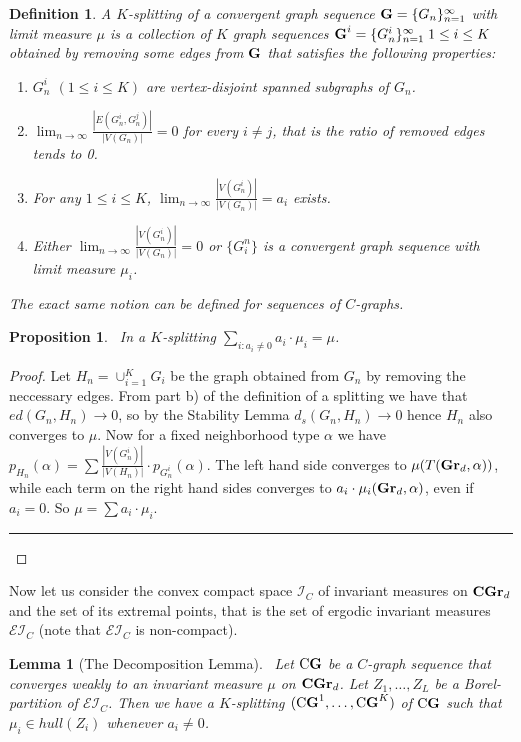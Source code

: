\documentclass{article}
\newtheorem{lemma}{Lemma}[section]
\newtheorem{propo}{Proposition}[section]
\newtheorem{defin}{Definition}[section]
\newcommand{\Grd}[1][d]{\textrm{\textbf{Gr}}_{#1}}
\newcommand{\CGrd}[1][d]{\textrm{\textbf{CGr}}_{#1}}
\newcommand{\G}{\textrm{\textbf{G}}}
\newcommand{\CG}[1][G]{\textrm{C\textbf{#1}}}
\newcommand{\I}{\mathcal{I}}
\newcommand{\EI}{\mathcal{EI}}
\newcommand{\Gseq}[1][G]{\{ #1_n \}_{n=1}^{\infty}}
\newcommand{\qed} {\hspace {0.1in} \rule {1.5mm} {3.5mm}}
\begin{document}
\begin{defin} A \textit{$K$-splitting} of a convergent graph sequence
  $\G = \Gseq$ with limit measure $\mu$ is a collection of $K$ graph
  sequences $\G^i = \Gseq[G^i]\; 1\leq i \leq K$ obtained by removing
  some edges from $\G$ that satisfies the following properties:
\begin{enumerate}
\item $G^i_n$ $(1\leq i\leq K)$ are vertex-disjoint spanned subgraphs of $G_n$.
\item $\lim_{n\to \infty} \frac{|E(G^i_n,G^j_n)|}{|V(G_n)|} = 0$ for
  every $i \neq j$, that is the ratio of removed edges tends to 0. 
\item For any $1\leq i \leq K$,
$\lim_{n\to\infty} \frac {|V(G^i_n)|}{|V(G_n)|} = a_i$ exists.
\item Either $\lim_{n\to\infty} \frac {|V(G^i_n)|}{|V(G_n)|}=0$
or $\{G^n_i\}$ is a convergent graph sequence with limit measure $\mu_i$.
\end{enumerate}
The exact same notion can be defined for sequences of $C$-graphs.
\end{defin}

\begin{propo}~\label{splitting} In a $K$-splitting $\sum_{i: a_i \neq 0} a_i
  \cdot \mu_i = \mu$.
\end{propo}

\begin{proof} Let $H_n = \cup_{i=1}^K G_i$ be the graph obtained from
  $G_n$ by removing the neccessary edges. From part b) of the
  definition of a splitting we have that $ed(G_n,H_n) \to 0$, so by
  the Stability Lemma $d_s(G_n,H_n) \to 0$ hence $H_n$ also converges
  to $\mu$. Now for a fixed neighborhood type $\alpha$ we have
  $p_{H_n}(\alpha) = \sum \frac{|V(G_n^i)|}{|V(H_n)|} \cdot
  p_{G_n^i}(\alpha)$. The left hand side converges to
  $\mu(T(\Grd,\alpha))$, while each term on the right hand sides
  converges to $a_i \cdot \mu_i(\Grd,\alpha)$, even if $a_i=0$. So
  $\mu = \sum a_i \cdot \mu_i$. \qed
\end{proof}

\smallskip

Now let us consider the convex compact space $\I_C$ of invariant
measures on $\CGrd$ and the set of its extremal points, that is the
set of ergodic invariant measures $\EI_C$ (note that $\EI_C$ is non-compact).
\begin{lemma}[The Decomposition Lemma]~\label{partitionlem} 
Let $\CG$ be a  $C$-graph sequence
that converges weakly to an invariant measure $\mu$ on $\CGrd$.  Let
$Z_1,\dots,Z_L$ be a Borel-partition of $\EI_C$.  Then we have a
$K$-splitting $(\CG^1,\dots,\CG^K)$ of $\CG$ such that $\mu_i \in
hull(Z_i)$ whenever $a_i \neq 0$.
 \end{lemma}
\end{document}
